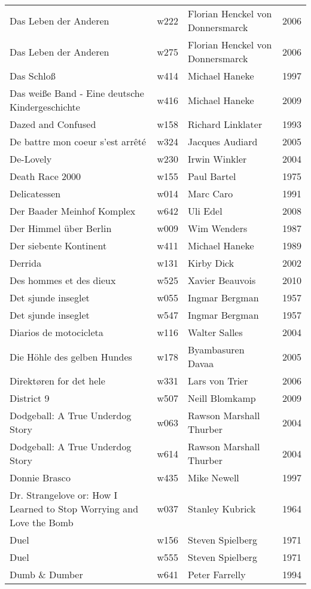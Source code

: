 \documentclass{article}
\begin{document}
\begin {center}
\begin{longtable}{p{10cm} l l l}
Das Leben der Anderen & w222 & Florian Henckel von Donnersmarck & 2006 \\
Das Leben der Anderen & w275 & Florian Henckel von Donnersmarck & 2006 \\
Das Schloß & w414 & Michael Haneke & 1997 \\
Das weiße Band - Eine deutsche Kindergeschichte & w416 & Michael Haneke & 2009 \\
Dazed and Confused & w158 & Richard Linklater & 1993 \\
De battre mon coeur s'est arrêté & w324 & Jacques Audiard & 2005 \\
De-Lovely & w230 & Irwin Winkler & 2004 \\
Death Race 2000 & w155 & Paul Bartel & 1975 \\
Delicatessen & w014 & Marc Caro & 1991 \\
Der Baader Meinhof Komplex & w642 & Uli Edel & 2008 \\
Der Himmel über Berlin & w009 & Wim Wenders & 1987 \\
Der siebente Kontinent & w411 & Michael Haneke & 1989 \\
Derrida & w131 & Kirby Dick & 2002 \\
Des hommes et des dieux & w525 & Xavier Beauvois & 2010 \\
Det sjunde inseglet & w055 & Ingmar Bergman & 1957 \\
Det sjunde inseglet & w547 & Ingmar Bergman & 1957 \\
Diarios de motocicleta & w116 & Walter Salles & 2004 \\
Die Höhle des gelben Hundes & w178 & Byambasuren Davaa & 2005 \\
Direktøren for det hele & w331 & Lars von Trier & 2006 \\
District 9 & w507 & Neill Blomkamp & 2009 \\
Dodgeball: A True Underdog Story & w063 & Rawson Marshall Thurber & 2004 \\
Dodgeball: A True Underdog Story & w614 & Rawson Marshall Thurber & 2004 \\
Donnie Brasco & w435 & Mike Newell & 1997 \\
Dr. Strangelove or: How I Learned to Stop Worrying and Love the Bomb & w037 & Stanley Kubrick & 1964 \\
Duel & w156 & Steven Spielberg & 1971 \\
Duel & w555 & Steven Spielberg & 1971 \\
Dumb \& Dumber & w641 & Peter Farrelly & 1994 \\

\end{longtable}
\end{center}
\end{document}
